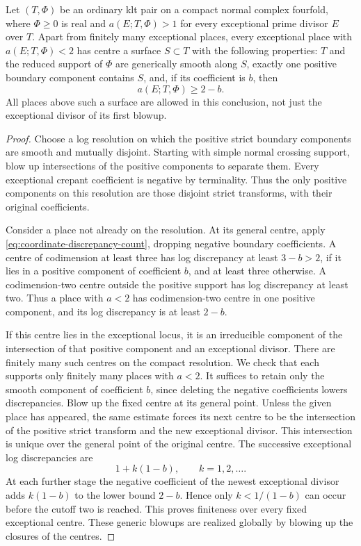 \begin{lemma}\label{lem:terminal-low-centres}
Let $(T,\Phi)$ be an ordinary klt pair on a compact normal complex
fourfold, where $\Phi\geq0$ is real and
$a(E;T,\Phi)>1$ for every exceptional prime divisor $E$ over $T$.
Apart from finitely many exceptional places, every exceptional place with
$a(E;T,\Phi)<2$ has centre a surface $S\subset T$ with the following
properties: $T$ and the reduced support of $\Phi$ are generically smooth
along $S$, exactly one positive boundary component contains $S$, and,
if its coefficient is $b$, then
\[
 a(E;T,\Phi)\geq 2-b.
\]
All places above such a surface are allowed in this conclusion, not just
the exceptional divisor of its first blowup.
\end{lemma}

\begin{proof}
Choose a log resolution on which the positive strict boundary components
are smooth and mutually disjoint.  Starting with simple normal crossing
support, blow up intersections of the positive components to separate
them.  Every exceptional crepant coefficient is negative by terminality.
Thus the only positive components on this resolution are those disjoint
strict transforms, with their original coefficients.

Consider a place not already on the resolution.  At its general centre,
apply \eqref{eq:coordinate-discrepancy-count}, dropping negative boundary
coefficients.  A centre of codimension at least three has log discrepancy
at least $3-b>2$, if it lies in a positive component of coefficient $b$,
and at least three otherwise.  A codimension-two centre outside the
positive support has log discrepancy at least two.  Thus a place with
$a<2$ has codimension-two centre in one positive component, and its log
discrepancy is at least $2-b$.

If this centre lies in the exceptional locus, it is an irreducible
component of the intersection of that positive component and an
exceptional divisor.  There are finitely many such centres on the compact
resolution.  We check that each supports only finitely many places with
$a<2$.  It suffices to retain only the smooth component of coefficient
$b$, since deleting the negative coefficients lowers discrepancies.
Blow up the fixed centre at its general point.  Unless the given place
has appeared, the same estimate forces its next centre to be the
intersection of the positive strict transform and the new exceptional
divisor.  This intersection is unique over the general point of the
original centre.  The successive exceptional log discrepancies are
\[
 1+k(1-b),\qquad k=1,2,\ldots.
\]
At each further stage the negative coefficient of the newest exceptional
divisor adds $k(1-b)$ to the lower bound $2-b$.  Hence only
$k<1/(1-b)$ can occur before the cutoff two is reached.  This proves
finiteness over every fixed exceptional centre.  These generic blowups
are realized globally by blowing up the closures of the centres.


\end{proof}

